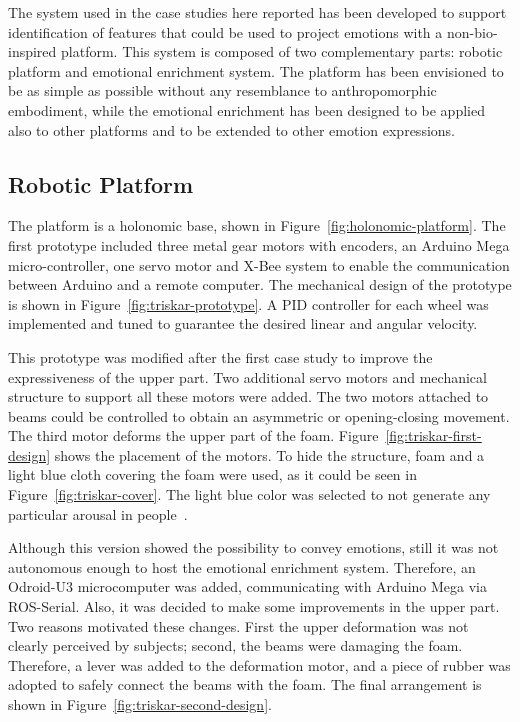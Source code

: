 The system used in the case studies here reported has been developed to support identification of features that could be used to project emotions with a non-bio-inspired platform. This system is composed of two complementary parts: robotic platform and emotional enrichment system. The platform has been envisioned to be as simple as possible without any resemblance to anthropomorphic embodiment, while the emotional enrichment has been designed to be applied also to other platforms and to be extended to other emotion expressions.
 
\subsection{Robotic Platform}
The platform is a holonomic base, shown in Figure~\ref{fig:holonomic-platform}. The first prototype included three metal gear motors with encoders, an Arduino Mega micro-controller, one servo motor and X-Bee system to enable the communication between Arduino and a remote computer. The mechanical design of the prototype is shown in Figure~\ref{fig:triskar-prototype}. A PID controller for each wheel was implemented and tuned to guarantee the desired linear and angular velocity.

This prototype was modified after the first case study to improve the expressiveness of the upper part. Two additional servo motors and mechanical structure to support all these motors were added. The two motors attached to beams could be controlled to obtain an asymmetric or opening-closing movement. 
The third motor deforms the upper part of the foam. Figure~\ref{fig:triskar-first-design} shows the placement of the motors. To hide the structure, foam and a light blue cloth covering the foam were used, as it could be seen in Figure~\ref{fig:triskar-cover}. The light blue color was selected to not generate any particular arousal in people~\cite{Naz2012}. 

Although this version showed the possibility to convey emotions, still it was not autonomous enough to host the emotional enrichment system. Therefore, an Odroid-U3 microcomputer was added, communicating with Arduino Mega via ROS-Serial.
Also, it was decided to make some improvements in the upper part. Two reasons motivated these changes. First the upper deformation was not clearly perceived by subjects; second, the beams were damaging the foam. Therefore, a lever was added to the deformation motor, and a piece of rubber was adopted to safely connect the beams with the foam. The final arrangement is shown in Figure~\ref{fig:triskar-second-design}.
 
